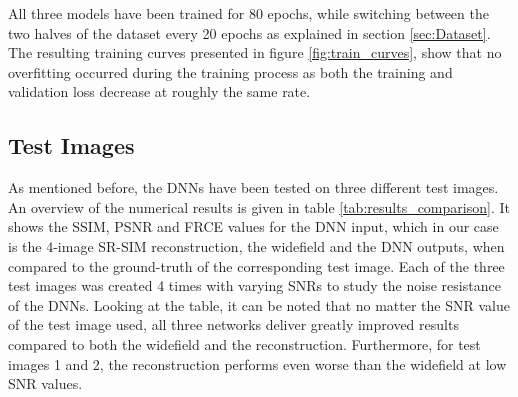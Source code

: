 \documentclass[conference]{IEEEtran}
\begin{document}
All three models have been trained for 80 epochs, while switching between the two halves of the dataset every 20 epochs as explained in section \ref{sec:Dataset}. The resulting training curves presented in figure \ref{fig:train_curves}, show that no overfitting occurred during the training process as both the training and validation loss decrease at roughly the same rate. 

\subsection{Test Images}

As mentioned before, the DNNs have been tested on three different test images. An overview of the numerical results is given in table \ref{tab:results_comparison}. It shows the SSIM, PSNR and FRCE values for the DNN input, which in our case is the 4-image SR-SIM reconstruction, the widefield and the DNN outputs, when compared to the ground-truth of the corresponding test image. Each of the three test images was created 4 times with varying SNRs to study the noise resistance of the DNNs. Looking at the table, it can be noted that no matter the SNR value of the test image used, all three networks deliver greatly improved results compared to both the widefield and the reconstruction. Furthermore, for test images 1 and 2, the reconstruction performs even worse than the widefield at low SNR values.
\end{document}
